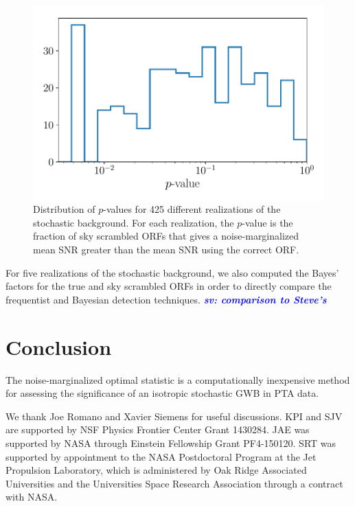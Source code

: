 \documentclass[twocolumn,aps,prd,superscriptaddress]{revtex4-1}
\newcommand{\sv}[1]{\textcolor{blue}{\it{\textbf{sv: #1}}} }
\begin{document}
\begin{figure}[htb]
	\includegraphics[width=0.9\columnwidth]{plots/os_skyscrambles.pdf}
	\caption{Distribution of $p$-values for 425 different realizations of the stochastic background. 
			For each realization, the $p$-value is the fraction of sky scrambled ORFs that gives a 
			noise-marginalized mean SNR greater than the mean SNR using the correct ORF.}
	\label{fig:skyscrambles}
\end{figure}

For five realizations of the stochastic background, we also computed the Bayes' factors for the 
true and sky scrambled ORFs in order to directly compare 
the frequentist and Bayesian detection techniques.
\sv{comparison to Steve's}


\section{Conclusion}
\label{sec:conclusion}

The noise-marginalized optimal statistic is a computationally inexpensive 
method for assessing the significance of an isotropic stochastic GWB in 
PTA data.


\acknowledgments
We thank Joe Romano and Xavier Siemens for useful discussions. 
KPI and SJV are supported by NSF Physics Frontier Center Grant 1430284.
JAE was supported by NASA through Einstein Fellowship Grant PF4-150120. 
SRT was supported by appointment to the NASA Postdoctoral Program 
at the Jet Propulsion Laboratory, which is administered by Oak Ridge Associated Universities 
and the Universities Space Research Association through a contract with NASA. 




\end{document}
